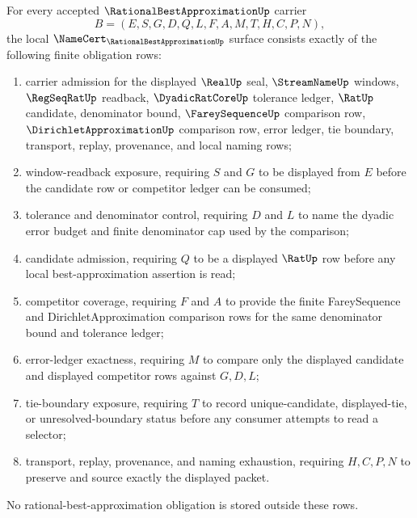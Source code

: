 \begin{theorem}
\label{thm:rational-best-approximation-namecert-obligations}
For every accepted $\RationalBestApproximationUp$ carrier
$$
B=(E,S,G,D,Q,L,F,A,M,T,H,C,P,N),
$$
the local $\NameCert_{\RationalBestApproximationUp}$ surface consists exactly of the following finite obligation rows:
\begin{enumerate}
\item carrier admission for the displayed $\RealUp$ seal, $\StreamNameUp$ windows, $\RegSeqRatUp$ readback, $\DyadicRatCoreUp$ tolerance ledger, $\RatUp$ candidate, denominator bound, $\FareySequenceUp$ comparison row, $\DirichletApproximationUp$ comparison row, error ledger, tie boundary, transport, replay, provenance, and local naming rows;
\item window-readback exposure, requiring $S$ and $G$ to be displayed from $E$ before the candidate row or competitor ledger can be consumed;
\item tolerance and denominator control, requiring $D$ and $L$ to name the dyadic error budget and finite denominator cap used by the comparison;
\item candidate admission, requiring $Q$ to be a displayed $\RatUp$ row before any local best-approximation assertion is read;
\item competitor coverage, requiring $F$ and $A$ to provide the finite FareySequence and DirichletApproximation comparison rows for the same denominator bound and tolerance ledger;
\item error-ledger exactness, requiring $M$ to compare only the displayed candidate and displayed competitor rows against $G,D,L$;
\item tie-boundary exposure, requiring $T$ to record unique-candidate, displayed-tie, or unresolved-boundary status before any consumer attempts to read a selector;
\item transport, replay, provenance, and naming exhaustion, requiring $H,C,P,N$ to preserve and source exactly the displayed packet.
\end{enumerate}
No rational-best-approximation obligation is stored outside these rows.
\end{theorem}
